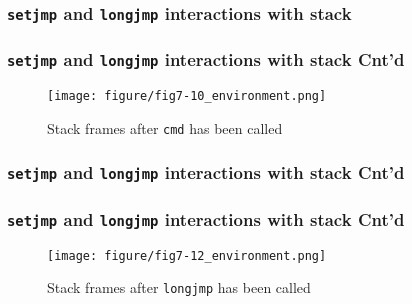 \documentclass[newPxFont,sthlmFooter,nooffset]{beamer}
\begin{document}
\begin{frame}[containsverbatim,t]
  \frametitle{\texttt{setjmp} and \texttt{longjmp} interactions with stack}

\end{frame}

\begin{frame}[containsverbatim,t]
  \frametitle{\texttt{setjmp} and \texttt{longjmp} interactions with stack Cnt'd}

\begin{figure}[h]
  \centering
  \texttt{[image: figure/fig7-10\_environment.png]}
  \caption{Stack frames after \texttt{cmd} has been called}
\end{figure}

\end{frame}

\begin{frame}[containsverbatim,t]
  \frametitle{\texttt{setjmp} and \texttt{longjmp} interactions with stack Cnt'd}



\end{frame}

\begin{frame}[containsverbatim,t]
  \frametitle{\texttt{setjmp} and \texttt{longjmp} interactions with stack Cnt'd}

\begin{figure}[h]
  \centering
  \texttt{[image: figure/fig7-12\_environment.png]}
  \caption{Stack frames after \texttt{longjmp} has been called}
\end{figure}

\end{frame}
\end{document}
